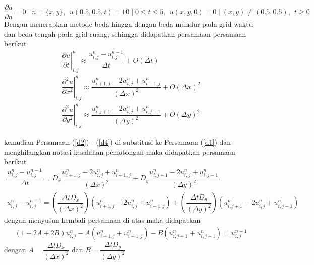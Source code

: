 $$ \dfrac{\partial u}{\partial n}=0 \mid n=\{x,y\},~~u(0.5,0.5,t)=10\mid 0\leq t \leq 5, ~~u(x,y,0)=0 \mid (x,y)\neq (0.5,0.5),~~t\geq 0$$
Dengan menerapkan metode beda hingga dengan beda mundur pada grid waktu dan beda tengah pada grid ruang, sehingga didapatkan persamaan-persamaan berikut
\begin{align}
	\left. \dfrac{\partial u}{\partial t} \right |_{i,j}^{n} \approx \dfrac{u_{i,j}^{n}-u_{i,j}^{n-1}}{\Delta t}+O(\Delta t) \label{d2} \\
	\left.  \dfrac{\partial^2 u}{\partial x^2} \right |_{i,j}^{n} \approx \dfrac{u_{i+1,j}^{n} - 2u_{i,j}^{n}+u_{i-1,j}^{n}}{(\Delta x)^2} + O(\Delta x)^2 \label{d3}\\
	\left. \dfrac{\partial^2 u}{\partial y^2} \right |_{i,j}^{n} \approx 
	\dfrac{u_{i,j+1}^{n} - 2u_{i,j}^{n} + u_{i,j-1}^{n}}{(\Delta y)^2} + O(\Delta y)^2 \label{d4}
\end{align}

kemudian Persamaan (\ref{d2}) - (\ref{d4}) di substitusi ke Persamaan (\ref{d1}) dan menghilangkan notasi kesalahan pemotongan maka didapatkan persamaan berikut 
\begin{align*}
	\dfrac{u_{i,j}^{n}-u_{i,j}^{n-1}}{\Delta t} = D_x \dfrac{u_{i+1,j}^{n} - 2u_{i,j}^{n} + u_{i-1,j}^{n}}{(\Delta x)^2} + D_y \dfrac{u_{i,j+1}^{n} - 2u_{i,j}^{n} + u_{i,j-1}^{n}}{(\Delta y)^2} \\
	u_{i,j}^{n} - u_{i,j}^{n-1}  = \left(\dfrac{\Delta t D_x}{(\Delta x)^2} \right) \left( u_{i+1,j}^{n} - 2u_{i,j}^{n} + u_{i-1,j}^{n}\right) + \left( \dfrac{\Delta t D_y}{(\Delta y)^2}\right) \left( u_{i,j+1}^{n} - 2u_{i,j}^{n} + u_{i,j-1}^{n}\right)
\end{align*}
dengan menyusun kembali persamaan di atas maka didapatkan
\begin{align}
	\left(1+2A+2B \right)  u_{i,j}^{n} - A \left( u_{i+1,j}^{n} + u_{i-1,j}^{n}\right) - B \left( u_{i,j+1}^{n}  + u_{i,j-1}^{n}\right) = u_{i,j}^{n-1} \label{d5}
\end{align}
dengan $ A=\dfrac{\Delta t D_x}{(\Delta x)^2} $ dan $ B=\dfrac{\Delta t D_y}{(\Delta y)^2} $

